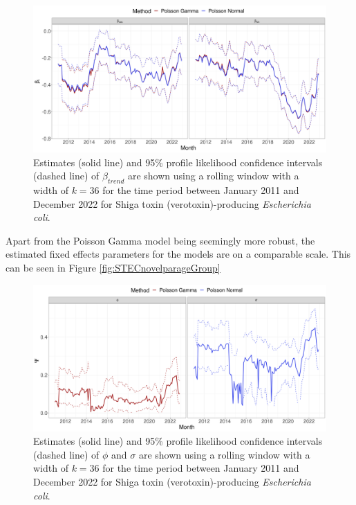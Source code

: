 \documentclass[a4paper,twoside,11pt]{report} %
\theoremstyle{definition}
\theoremstyle{definition}
\theoremstyle{definition}
\theoremstyle{definition}
\theoremstyle{remark}
\begin{document}
\begin{figure}[H]
\includegraphics[width=1\linewidth]{../figures/STEC_novel_par_seasonality} \caption{Estimates (solid line) and 95\% profile likelihood confidence intervals (dashed line) of \(\beta_{trend}\) are shown using a rolling window with a width of \(k=36\) for the time period between January 2011 and December 2022 for Shiga toxin (verotoxin)-producing \textit{Escherichia coli}.}\label{fig:STECnovelparseasonality}
\end{figure}

Apart from the Poisson Gamma model being seemingly more robust, the estimated fixed effects parameters for the models are on a comparable scale. This can be seen in Figure \ref{fig:STECnovelparageGroup}



\begin{figure}[H]
\includegraphics[width=1\linewidth]{../figures/STEC_novel_par_dispersion} \caption{Estimates (solid line) and 95\% profile likelihood confidence intervals (dashed line) of \(\phi\) and \(\sigma\) are shown using a rolling window with a width of \(k=36\) for the time period between January 2011 and December 2022 for Shiga toxin (verotoxin)-producing \textit{Escherichia coli}.}\label{fig:STECnovelparseaDispersion}
\end{figure}
\end{document}
